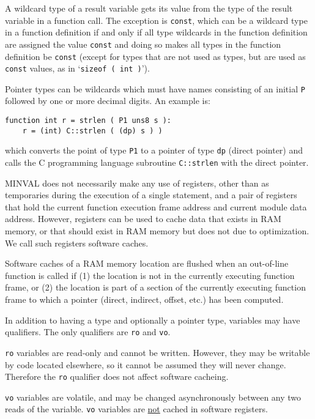 \documentclass[12pt]{article}
\newenvironment{indpar}[1][0.3in]%
	{\begin{list}{}%
		     {\setlength{\itemsep}{0in}%
		      \setlength{\topsep}{0in}%
		      \setlength{\parsep}{1ex}%
		      \setlength{\labelwidth}{#1}%
		      \setlength{\leftmargin}{#1}%
		      \addtolength{\leftmargin}{\labelsep}}%
	 \item}%
	{\end{list}}
\begin{document}
A wildcard type of a result variable gets its value from the
type of the result variable in a function call.  The exception
is {\tt const}, which can be a wildcard type in a function
definition if and only if all type wildcards in the function definition
are assigned the value {\tt const} and doing so makes
all types in the function definition be {\tt const}
(except for types that are not used as types, but are used as
{\tt const} values, as in `{\tt sizeof ( int )}').

Pointer types can be wildcards which must have names consisting
of an initial {\tt P} followed by one or more decimal digits.
An example is:

\begin{indpar}\begin{verbatim}
function int r = strlen ( P1 uns8 s ):
    r = (int) C::strlen ( (dp) s ) )
\end{verbatim}\end{indpar}

which converts the point of type {\tt P1} to a pointer of
type {\tt dp} (direct pointer) and calls the C programming
language subroutine {\tt C::strlen} with the direct pointer.

MINVAL does not necessarily make any use of registers, other
than as temporaries during the execution of a single statement,
and a pair of registers that hold the current function
execution frame address and current module data address.
However, registers can be used to cache data that exists in
RAM memory, or that should exist in RAM memory but does not
due to optimization.  We call such registers software
caches.

Software caches of a RAM memory location are flushed when an out-of-line
function is called if (1) the location is not in the currently
executing function frame, or (2) the location is part of a
section of the currently executing function frame to which
a pointer (direct, indirect, offset, etc.) has been computed.

In addition to having a type and optionally a pointer type,
variables may have qualifiers.  The only qualifiers are
{\tt ro} and {\tt vo}.

{\tt ro} variables are read-only and
cannot be written.  However, they may be writable by
code located elsewhere, so it cannot be assumed they will
never change.  Therefore the {\tt ro} qualifier does not
affect software cacheing.

{\tt vo} variables are volatile, and may be changed asynchronously
between any two reads of the variable.  {\tt vo} variables are
\underline{not} cached in software registers.
\end{document}
